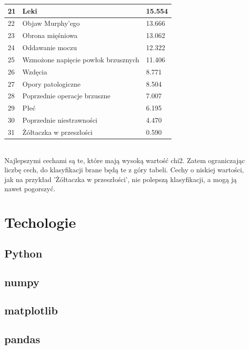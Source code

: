 \documentclass{report}
\begin{document}
\begin{tabular}{|l|l|l|}
        \hline 21 & Leki & 15.554 \\
        \hline 22 & Objaw Murphy'ego & 13.666 \\
        \hline 23 & Obrona mięśniowa & 13.062 \\
        \hline 24 & Oddawanie moczu & 12.322 \\
        \hline 25 & Wzmożone napięcie powłok brzusznych & 11.406 \\
        \hline 26 & Wzdęcia & 8.771 \\
        \hline 27 & Opory patologiczne & 8.504 \\
        \hline 28 & Poprzednie operacje brzuszne & 7.007 \\
        \hline 29 & Płeć & 6.195 \\
        \hline 30 & Poprzednie niestrawności & 4.470 \\
        \hline 31 & Żółtaczka w przeszłości & 0.590 \\
        \hline

    \end{tabular} \\

    Najlepszymi cechami są te, które mają wysoką wartość chi2.
    Zatem ograniczając liczbę cech, do klasyfikacji brane będą te z góry tabeli.
    Cechy o niskiej wartości, jak na przykład 'Żółtaczka w przeszłości', nie polepszą klasyfikacji, a mogą ją nawet pogorszyć.

    \chapter{Techologie}

    \section{Python}

    \section{numpy}

    \section{matplotlib}

    \section{pandas}
\end{document}
